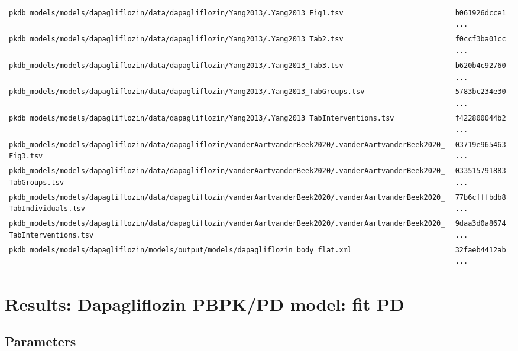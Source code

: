 \begin{longtable}{ll}
\texttt{pkdb\_models/models/dapagliflozin/data/dapagliflozin/Yang2013/.Yang2013\_Fig1.tsv} & \texttt{b061926dcce1...} \\
\texttt{pkdb\_models/models/dapagliflozin/data/dapagliflozin/Yang2013/.Yang2013\_Tab2.tsv} & \texttt{f0ccf3ba01cc...} \\
\texttt{pkdb\_models/models/dapagliflozin/data/dapagliflozin/Yang2013/.Yang2013\_Tab3.tsv} & \texttt{b620b4c92760...} \\
\texttt{pkdb\_models/models/dapagliflozin/data/dapagliflozin/Yang2013/.Yang2013\_TabGroups.tsv} & \texttt{5783bc234e30...} \\
\texttt{pkdb\_models/models/dapagliflozin/data/dapagliflozin/Yang2013/.Yang2013\_TabInterventions.tsv} & \texttt{f422800044b2...} \\
\texttt{pkdb\_models/models/dapagliflozin/data/dapagliflozin/vanderAartvanderBeek2020/.vanderAartvanderBeek2020\_Fig3.tsv} & \texttt{03719e965463...} \\
\texttt{pkdb\_models/models/dapagliflozin/data/dapagliflozin/vanderAartvanderBeek2020/.vanderAartvanderBeek2020\_TabGroups.tsv} & \texttt{033515791883...} \\
\texttt{pkdb\_models/models/dapagliflozin/data/dapagliflozin/vanderAartvanderBeek2020/.vanderAartvanderBeek2020\_TabIndividuals.tsv} & \texttt{77b6cfffbdb8...} \\
\texttt{pkdb\_models/models/dapagliflozin/data/dapagliflozin/vanderAartvanderBeek2020/.vanderAartvanderBeek2020\_TabInterventions.tsv} & \texttt{9daa3d0a8674...} \\
\texttt{pkdb\_models/models/dapagliflozin/models/output/models/dapagliflozin\_body\_flat.xml} & \texttt{32faeb4412ab...} \\
\end{longtable}

\section{Results: Dapagliflozin PBPK/PD model: fit PD}

\subsection{Parameters}

